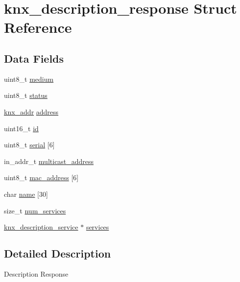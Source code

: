 \hypertarget{structknx__description__response}{}\section{knx\+\_\+description\+\_\+response Struct Reference}
\label{structknx__description__response}
\subsection*{Data Fields}
\begin{DoxyCompactItemize}
\item 
uint8\+\_\+t \hyperlink{structknx__description__response_a3a9e9c6e0c5d3cc57f97e971abfb0821}{medium}
\item 
uint8\+\_\+t \hyperlink{structknx__description__response_acc6946b251718d1d4f7194ea7c8dd6f2}{status}
\item 
\hyperlink{address_8h_a88b9bc5d57b990da72d16dc49b9448df}{knx\+\_\+addr} \hyperlink{structknx__description__response_a43e5129c5778de2c6be48175a8d5557b}{address}
\item 
uint16\+\_\+t \hyperlink{structknx__description__response_a03e19f72ab56858f9be135caf94a11bd}{id}
\item 
uint8\+\_\+t \hyperlink{structknx__description__response_abad2d979f11eea0015185c7f177c7943}{serial} \mbox{[}6\mbox{]}
\item 
in\+\_\+addr\+\_\+t \hyperlink{structknx__description__response_a2307d33aad8c0a6245b2b17a4c202fb7}{multicast\+\_\+address}
\item 
uint8\+\_\+t \hyperlink{structknx__description__response_ad6a357cb848d774479de61402dd574a5}{mac\+\_\+address} \mbox{[}6\mbox{]}
\item 
char \hyperlink{structknx__description__response_af448ef6b2aaaaefbb1cbd9f6c8c4b072}{name} \mbox{[}30\mbox{]}
\item 
size\+\_\+t \hyperlink{structknx__description__response_afdf2cfaf2090a90c01eaf745f869ceb0}{num\+\_\+services}
\item 
\hyperlink{structknx__description__service}{knx\+\_\+description\+\_\+service} $\ast$ \hyperlink{structknx__description__response_abbe041d6218aac9fe89c0d7779491763}{services}
\end{DoxyCompactItemize}


\subsection{Detailed Description}
Description Response 

